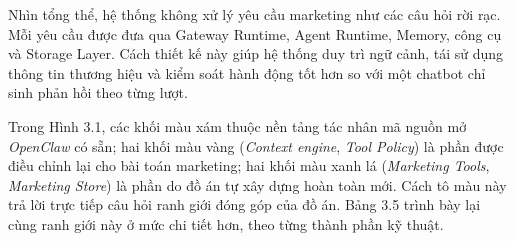 \documentclass[a4paper]{article}
\begin{document}
Nhìn tổng thể, hệ thống không xử lý yêu cầu marketing như các câu hỏi rời rạc. Mỗi yêu cầu được đưa qua Gateway Runtime, Agent Runtime, Memory, công cụ và Storage Layer. Cách thiết kế này giúp hệ thống duy trì ngữ cảnh, tái sử dụng thông tin thương hiệu và kiểm soát hành động tốt hơn so với một chatbot chỉ sinh phản hồi theo từng lượt.

Trong Hình 3.1, các khối màu xám thuộc nền tảng tác nhân mã nguồn mở \textit{OpenClaw} có sẵn; hai khối màu vàng (\textit{Context engine}, \textit{Tool Policy}) là phần được điều chỉnh lại cho bài toán marketing; hai khối màu xanh lá (\textit{Marketing Tools}, \textit{Marketing Store}) là phần do đồ án tự xây dựng hoàn toàn mới. Cách tô màu này trả lời trực tiếp câu hỏi ranh giới đóng góp của đồ án. Bảng 3.5 trình bày lại cùng ranh giới này ở mức chi tiết hơn, theo từng thành phần kỹ thuật.
\end{document}
